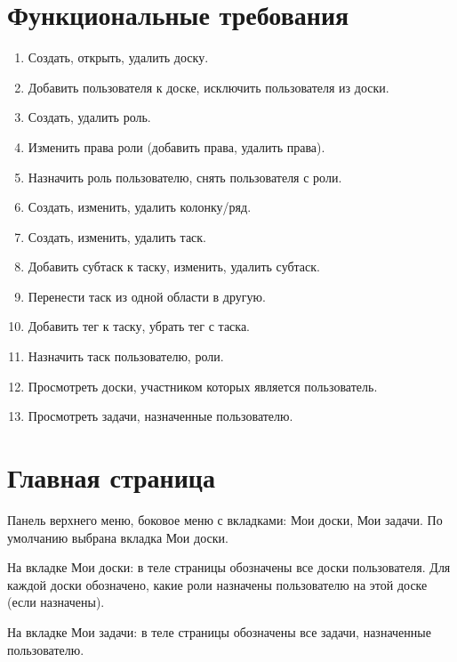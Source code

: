 \documentclass{tmcorreport}
\begin{document}
\section*{Функциональные требования}
\begin{enumerate}
    \item Создать, открыть, удалить доску.
    \item Добавить пользователя к доске, исключить пользователя из доски.
    \item Создать, удалить роль.
    \item Изменить права роли (добавить права, удалить права).
    \item Назначить роль пользователю, снять пользователя с роли.
    \item Создать, изменить, удалить колонку/ряд.
    \item Создать, изменить, удалить таск.
    \item Добавить субтаск к таску, изменить, удалить субтаск.
    \item Перенести таск из одной области в другую.
    \item Добавить тег к таску, убрать тег с таска.
    \item Назначить таск пользователю, роли.
    \item Просмотреть доски, участником которых является пользователь.
    \item Просмотреть задачи, назначенные пользователю.
\end{enumerate}

\section*{Главная страница}
\begin{description}
    \item Панель верхнего меню, боковое меню с вкладками: Мои доски, Мои задачи. По умолчанию выбрана вкладка Мои доски.
    \item На вкладке Мои доски: в теле страницы обозначены все доски пользователя. Для каждой доски обозначено, какие роли назначены пользователю на этой доске (если назначены).
    \item На вкладке Мои задачи: в теле страницы обозначены все задачи, назначенные пользователю.
\end{description}
\end{document}
